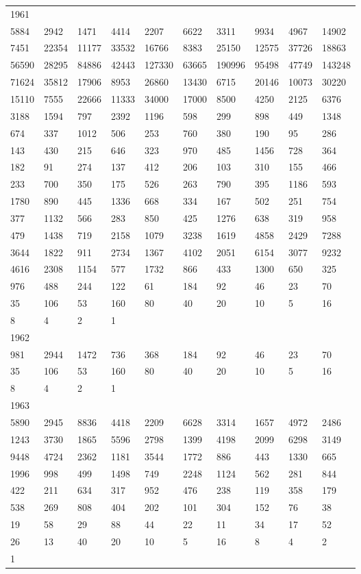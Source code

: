 \begin{longtable}{*{10}{l}}
1961&&&&&&&&&\\
5884& 2942& 1471& 4414& 2207& 6622& 3311& 9934& 4967& 14902\\
7451& 22354& 11177& 33532& 16766& 8383& 25150& 12575& 37726& 18863\\
56590& 28295& 84886& 42443& 127330& 63665& 190996& 95498& 47749& 143248\\
71624& 35812& 17906& 8953& 26860& 13430& 6715& 20146& 10073& 30220\\
15110& 7555& 22666& 11333& 34000& 17000& 8500& 4250& 2125& 6376\\
3188& 1594& 797& 2392& 1196& 598& 299& 898& 449& 1348\\
674& 337& 1012& 506& 253& 760& 380& 190& 95& 286\\
143& 430& 215& 646& 323& 970& 485& 1456& 728& 364\\
182& 91& 274& 137& 412& 206& 103& 310& 155& 466\\
233& 700& 350& 175& 526& 263& 790& 395& 1186& 593\\
1780& 890& 445& 1336& 668& 334& 167& 502& 251& 754\\
377& 1132& 566& 283& 850& 425& 1276& 638& 319& 958\\
479& 1438& 719& 2158& 1079& 3238& 1619& 4858& 2429& 7288\\
3644& 1822& 911& 2734& 1367& 4102& 2051& 6154& 3077& 9232\\
4616& 2308& 1154& 577& 1732& 866& 433& 1300& 650& 325\\
976& 488& 244& 122& 61& 184& 92& 46& 23& 70\\
35& 106& 53& 160& 80& 40& 20& 10& 5& 16\\
8& 4& 2& 1& \\

1962&&&&&&&&&\\
981& 2944& 1472& 736& 368& 184& 92& 46& 23& 70\\
35& 106& 53& 160& 80& 40& 20& 10& 5& 16\\
8& 4& 2& 1& \\

1963&&&&&&&&&\\
5890& 2945& 8836& 4418& 2209& 6628& 3314& 1657& 4972& 2486\\
1243& 3730& 1865& 5596& 2798& 1399& 4198& 2099& 6298& 3149\\
9448& 4724& 2362& 1181& 3544& 1772& 886& 443& 1330& 665\\
1996& 998& 499& 1498& 749& 2248& 1124& 562& 281& 844\\
422& 211& 634& 317& 952& 476& 238& 119& 358& 179\\
538& 269& 808& 404& 202& 101& 304& 152& 76& 38\\
19& 58& 29& 88& 44& 22& 11& 34& 17& 52\\
26& 13& 40& 20& 10& 5& 16& 8& 4& 2\\
1& \\


\end{longtable}
